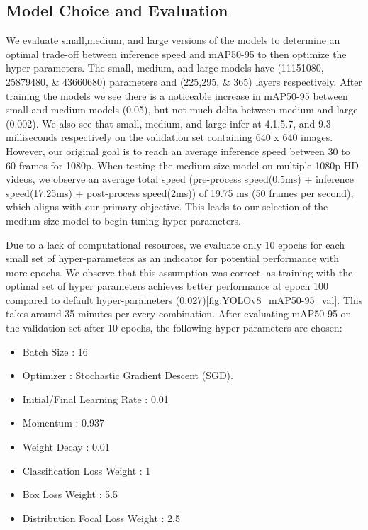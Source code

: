 \documentclass[10pt,twocolumn,letterpaper]{article}
\begin{document}
\subsection{Model Choice and Evaluation}

We evaluate small,medium, and large versions of the models to determine an optimal trade-off between inference speed and mAP50-95 to then optimize the hyper-parameters. The small, medium, and large models have (11151080, 25879480, \& 43660680) parameters and (225,295, \& 365) layers respectively. After training the models we see there is a noticeable increase in mAP50-95 between small and medium models (0.05), but not much delta between medium and large (0.002). We also see that small, medium, and large infer at 4.1,5.7, and 9.3 milliseconds respectively on the validation set containing 640 x 640 images. However, our original goal is to reach an average inference speed between 30 to 60 frames for 1080p. When testing the medium-size model on multiple 1080p HD videos, we observe an average total speed (pre-process speed(0.5ms) + inference speed(17.25ms) + post-process speed(2ms)) of 19.75 ms (50 frames per second), which aligns with our primary objective. This leads to our selection of the medium-size model to begin tuning hyper-parameters.

Due to a lack of computational resources, we evaluate only 10 epochs for each small set of hyper-parameters as an indicator for potential performance with more epochs. We observe that this assumption was correct, as training with the optimal set of hyper parameters achieves better performance at epoch 100 compared to default hyper-parameters (0.027)\ref{fig:YOLOv8_mAP50-95_val}. This takes around 35 minutes per every combination. After evaluating mAP50-95 on the validation set after 10 epochs, the following hyper-parameters are chosen:
\begin{itemize}
  \item Batch Size : 16
  \item Optimizer : Stochastic Gradient Descent (SGD).
  \item Initial/Final Learning Rate : 0.01
  \item Momentum : 0.937
  \item Weight Decay : 0.01
  \item Classification Loss Weight : 1
  \item Box Loss Weight : 5.5
  \item Distribution Focal Loss Weight : 2.5
\end{itemize}
\end{document}
